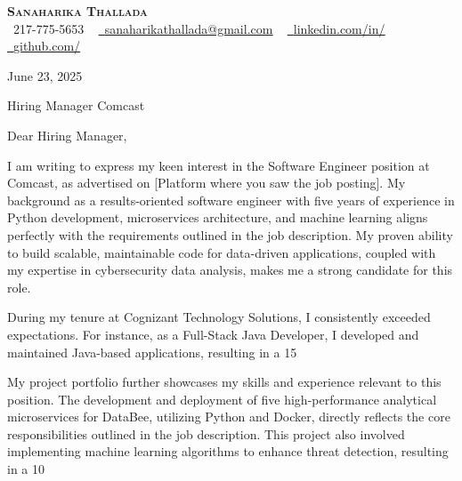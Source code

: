 \documentclass[letterpaper,11pt]{article}
\begin{document}
\begin{center}
    \textbf{\Huge \scshape {\fontsize{15pt}{20pt}\selectfont Sanaharika Thallada}} \\ \vspace{1pt}
    \small \raisebox{-0.1\height}\faPhone\ 217-775-5653 ~ \href{mailto:sanaharikathallada@gmail.com}{\raisebox{-0.2\height}\faEnvelope\  \underline{sanaharikathallada@gmail.com}} ~
    \href{https://www.linkedin.com/in/yashwanthtirupati/}{\raisebox{-0.2\height}\faLinkedin\ \underline{linkedin.com/in/}} ~
    \href{}{\raisebox{-0.2\height}\faGithub\ \underline{github.com/}}
\end{center}
\vspace{0.5cm}

June 23, 2025

Hiring Manager
Comcast

Dear Hiring Manager,

I am writing to express my keen interest in the Software Engineer position at Comcast, as advertised on [Platform where you saw the job posting].  My background as a results-oriented software engineer with five years of experience in Python development, microservices architecture, and machine learning aligns perfectly with the requirements outlined in the job description.  My proven ability to build scalable, maintainable code for data-driven applications, coupled with my expertise in cybersecurity data analysis, makes me a strong candidate for this role.

During my tenure at Cognizant Technology Solutions, I consistently exceeded expectations.  For instance, as a Full-Stack Java Developer, I developed and maintained Java-based applications, resulting in a 15%

My project portfolio further showcases my skills and experience relevant to this position.  The development and deployment of five high-performance analytical microservices for DataBee, utilizing Python and Docker, directly reflects the core responsibilities outlined in the job description. This project also involved implementing machine learning algorithms to enhance threat detection, resulting in a 10%
\end{document}

